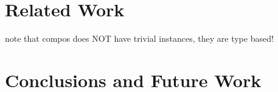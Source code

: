 \documentclass[preprint]{sigplanconf}
\begin{document}
\section{Related Work}

note that compos does NOT have trivial instances, they are type based!

\section{Conclusions and Future Work}




\begin{comment}

There have been several attempts at generic traversal/query methods in Haskell. One initial paper was <a href="http://doi.acm.org/10.1145/604174.604179">"Scrap your boilerplate: a practical design pattern for generic programming"</a> (<a href="http://www.cs.vu.nl/boilerplate/tldi03.pdf">free copy</a>) - which I will refer to as SYB. Another mechanism is <a href="http://doi.acm.org/10.1145/1159803.1159834">"A Pattern for Almost Compositional Functions"</a> (<a href="http://www.cs.chalmers.se/%

The principle advantage of the Play class over these two papers is that it requires no type system extensions, compared to rank-2 types for SYB and GADT's for Compos. The simplicity of the types required means that the user is free to concentrate on the operations within the class, without requiring thought as to the type trickery required. The Play pattern has been implemented in Yhc for the Core data type, and in Catch on several data types within the program.
</p>
<p>
    This document proceeds as follows:
</p>
<ol>
    <li>The motivation and use cases for Play</li>
    <li>How to use the Play class</li>
    <li>Derivation of a Play instance for your own data type</li>
    <li>Extension to PlayEx</li>
    <li>A comparison to the SYB paper</li>
    <li>A comparison to the Compos paper</li>
</ol>
<p>
    All the examples used in this document can be found in the darcs repository, under the <tt>Examples</tt> directory.
</p>
<pre>
darcs get --partial <a href="http://www.cs.york.ac.uk/fp/darcs/play">http://www.cs.york.ac.uk/fp/darcs/play</a>
</pre>
<p>
    If you only wish to read a small fraction of this document, can I suggest you pay particular attention to <tt>mapUnder</tt> and <tt>allOver</tt> - these are by far the most common transformational patterns.
</p>


\end{comment}
\end{document}
